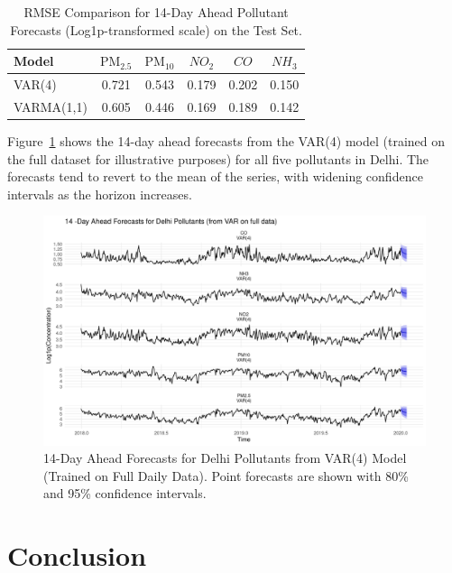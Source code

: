 \documentclass[fleqn,10pt]{SelfArx} %
\begin{document}
\begin{table}[hbt]
\caption{RMSE Comparison for 14-Day Ahead Pollutant Forecasts (Log1p-transformed scale) on the Test Set.}
\centering
\begin{tabular}{lccccc}
\toprule
Model        & $\text{PM}_{2.5}$ & $\text{PM}_{10}$ & $NO_2$ & $CO$ & $NH_3$ \\
\midrule
VAR(4)       & 0.721 & 0.543 & 0.179 & 0.202 & 0.150 \\
VARMA(1,1)   & 0.605 & 0.446 & 0.169 & 0.189 & 0.142 \\
\bottomrule
\end{tabular}
\label{tab:rmse_comparison}
\end{table}

Figure~\ref{fig:var_forecast_delhi} shows the 14-day ahead forecasts from the VAR(4) model (trained on the full dataset for illustrative purposes) for all five pollutants in Delhi. The forecasts tend to revert to the mean of the series, with widening confidence intervals as the horizon increases.

\begin{figure}[ht]
    \centering
    \includegraphics[width=\linewidth]{../analysis/assets/var_forecast_delhi.png}
    \caption{14-Day Ahead Forecasts for Delhi Pollutants from VAR(4) Model (Trained on Full Daily Data). Point forecasts are shown with 80\% and 95\% confidence intervals.}
    \label{fig:var_forecast_delhi}
\end{figure}



\section{Conclusion}
\end{document}
